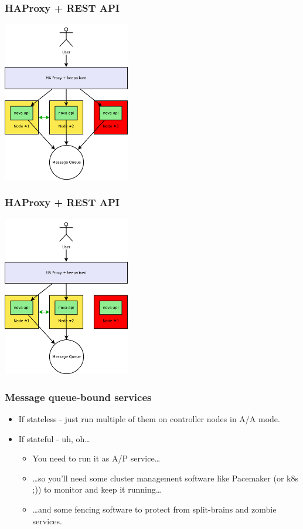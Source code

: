 \documentclass[aspectratio=169]{beamer}
\begin{document}
\begin{frame}
    \frametitle{HAProxy + REST API}
    \begin{center}
        \includegraphics[height=7cm]{images/haproxy2.png}
    \end{center}
\end{frame}

\begin{frame}
    \frametitle{HAProxy + REST API}
    \begin{center}
        \includegraphics[height=7cm]{images/haproxy3.png}
    \end{center}
\end{frame}

\begin{frame}
    \frametitle{Message queue-bound services}
    \begin{itemize}
        \item If stateless - just run multiple of them on controller nodes in A/A mode.
        \pause
        \item If stateful - uh, oh…
        \pause
        \begin{itemize}
            \item You need to run it as A/P service…
            \pause
            \item …so you'll need some cluster management software like Pacemaker (or k8s ;)) to monitor and keep it running…
            \pause
            \item …and some fencing software to protect from split-brains and zombie services.
        \end{itemize}
    \end{itemize}
\end{frame}
\end{document}

